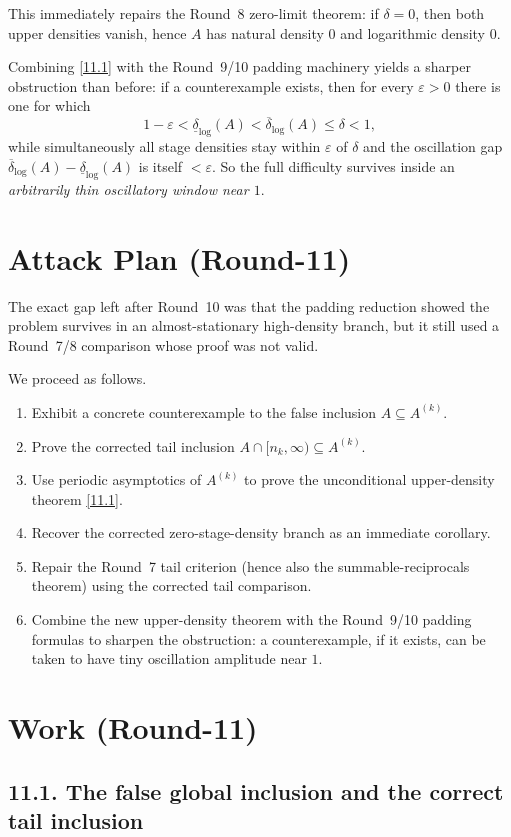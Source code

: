 This immediately repairs the Round~8 zero-limit theorem: if $\delta=0$, then both upper densities vanish, hence $A$ has natural density $0$ and logarithmic density $0$.

Combining \eqref{11.1} with the Round~9/10 padding machinery yields a sharper obstruction than before: if a counterexample exists, then for every $\varepsilon>0$ there is one for which
\[
1-\varepsilon<\underline\delta_{\log}(A)<\overline\delta_{\log}(A)\le \delta<1,
\]
while simultaneously all stage densities stay within $\varepsilon$ of $\delta$ and the oscillation gap
\(\overline\delta_{\log}(A)-\underline\delta_{\log}(A)\)
is itself $<\varepsilon$.
So the full difficulty survives inside an \emph{arbitrarily thin oscillatory window near $1$}.

\section{Attack Plan (Round-11)}
The exact gap left after Round~10 was that the padding reduction showed the problem survives in an almost-stationary high-density branch, but it still used a Round~7/8 comparison whose proof was not valid.

We proceed as follows.
\begin{enumerate}
\item Exhibit a concrete counterexample to the false inclusion $A\subseteq A^{(k)}$.
\item Prove the corrected tail inclusion $A\cap[n_k,\infty)\subseteq A^{(k)}$.
\item Use periodic asymptotics of $A^{(k)}$ to prove the unconditional upper-density theorem \eqref{11.1}.
\item Recover the corrected zero-stage-density branch as an immediate corollary.
\item Repair the Round~7 tail criterion (hence also the summable-reciprocals theorem) using the corrected tail comparison.
\item Combine the new upper-density theorem with the Round~9/10 padding formulas to sharpen the obstruction: a counterexample, if it exists, can be taken to have tiny oscillation amplitude near $1$.
\end{enumerate}

\section{Work (Round-11)}
\subsection*{11.1. The false global inclusion and the correct tail inclusion}
